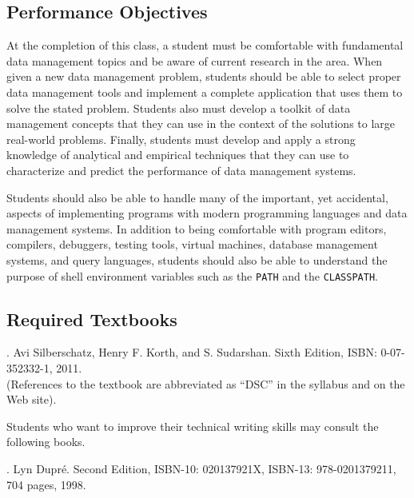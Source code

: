 \subsection*{Performance Objectives}

At the completion of this class, a student must be comfortable with fundamental data management topics and be aware of
current research in the area.  When given a new data management problem, students should be able to select proper data
management tools and implement a complete application that uses them to solve the stated problem.  Students also must
develop a toolkit of data management concepts that they can use in the context of the solutions to large real-world
problems.  Finally, students must develop and apply a strong knowledge of analytical and empirical techniques that they
can use to characterize and predict the performance of data management systems.

Students should also be able to handle many of the important, yet accidental, aspects of implementing programs with
modern programming languages and data management systems.  In addition to being comfortable with program editors,
compilers, debuggers, testing tools, virtual machines, database management systems, and query languages, students should
also be able to understand the purpose of shell environment variables such as the {\tt PATH} and the {\tt CLASSPATH}.

\subsection*{Required Textbooks}


. Avi Silberschatz, Henry F. Korth, and S. Sudarshan.
Sixth Edition, ISBN: 0-07-352332-1, 2011. \\
(References to the textbook are abbreviated as ``DSC'' in the syllabus and on the Web site).

\noindent
Students who want to improve their technical writing skills may consult the following books.

. Lyn Dupr\'e. Second Edition,  ISBN-10: 020137921X,
ISBN-13: 978-0201379211, 704 pages, 1998.

